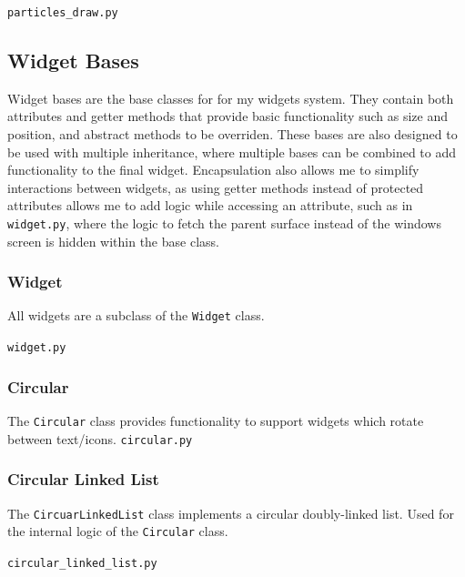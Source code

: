 \documentclass[../main/main.tex]{subfiles}
\begin{document}
\noindent\verb|particles_draw.py|


\subsection{Widget Bases}
\label{sec:widget-bases}
Widget bases are the base classes for for my widgets system. They contain both attributes and getter methods that provide basic functionality such as size and position, and abstract methods to be overriden. These bases are also designed to be used with multiple inheritance, where multiple bases can be combined to add functionality to the final widget. Encapsulation also allows me to simplify interactions between widgets, as using getter methods instead of protected attributes allows me to add logic while accessing an attribute, such as in \verb|widget.py|, where the logic to fetch the parent surface instead of the windows screen is hidden within the base class.

\subsubsection*{Widget}
\noindent All widgets are a subclass of the \lstinline{Widget} class.

\noindent\verb|widget.py|


\subsubsection*{Circular}
\noindent The \lstinline{Circular} class provides functionality to support widgets which rotate between text/icons.
\noindent\verb|circular.py|


\subsubsection*{Circular Linked List}
\label{sec:linked-list}
The \lstinline{CircuarLinkedList} class implements a circular doubly-linked list. Used for the internal logic of the \lstinline{Circular} class.

\noindent\verb|circular_linked_list.py|

\end{document}
